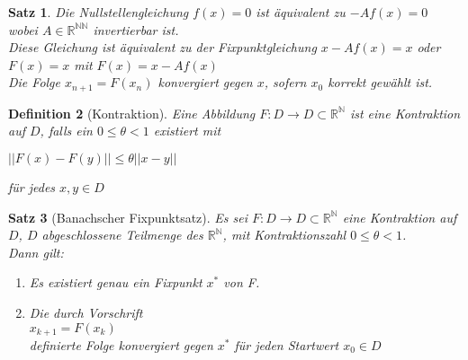 \documentclass[a4paper]{article}
\newcounter{Sec}
\theoremstyle{marginbreak}
\newtheorem{definition}{Definition}[Sec]
\newtheorem{satz}[definition]{Satz}
\begin{document}
	\begin{satz}
		Die Nullstellengleichung $f(x) = 0$ ist äquivalent zu $-Af(x) = 0$ wobei $A \in \mathbb{R}^{\mathbb{N}\mathbb{N}}$ invertierbar ist.\\
		Diese Gleichung ist äquivalent zu der Fixpunktgleichung $x - Af(x) = x$ oder $F(x)=x$ mit $F(x) = x - Af(x)$\\
		
		Die Folge $x_{n+1} = F(x_n)$ konvergiert gegen $x$, sofern $x_0$ korrekt gewählt ist.
	\end{satz}

	\begin{definition}[Kontraktion]
		Eine Abbildung $F : D \to D \subset \mathbb{R}^\mathbb{N}$ ist eine Kontraktion auf $D$, falls ein $0 \leq \theta < 1$ existiert mit
		\begin{description}
			\item $||F(x) - F(y)|| \leq \theta ||x - y||$
		\end{description}
		für jedes $x, y \in D$
	\end{definition}

	\begin{satz}[Banachscher Fixpunktsatz]
		Es sei $F : D \to D \subset \mathbb{R}^\mathbb{N}$ eine Kontraktion auf $D$, $D$ abgeschlossene Teilmenge des $\mathbb{R}^\mathbb{N}$, mit Kontraktionszahl $0 \leq \theta < 1$. \\
		Dann gilt:
		\begin{enumerate}
			\item Es existiert genau ein Fixpunkt $x^*$ von F.
			\item Die durch Vorschrift\\
				$x_{k+1} = F(x_k)$ \\
			definierte Folge konvergiert gegen $x^*$ für jeden Startwert $x_0 \in D$ 
		\end{enumerate}
	\end{satz}
\end{document}
